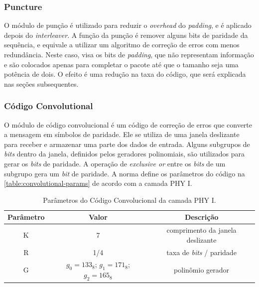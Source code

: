 	\subsubsection*{Puncture}

	O módulo de punção é utilizado para reduzir o \textit{overhead} do \textit{padding}, e é aplicado depois do \textit{interleaver}. A função da punção é remover alguns bits de paridade da sequência, e equivale a utilizar um algoritmo de correção de erros com menos redundância. Neste caso, visa os bits de \textit{padding}, que não representam informação e são colocados apenas para completar o pacote até que o tamanho seja uma potência de dois. O efeito é uma redução na taxa do código, que será explicada nas seções subsequentes.

	\subsubsection*{Código Convolutional}

	O módulo de código convolucional é um código de correção de erros que converte a mensagem em símbolos de paridade. Ele se utiliza de uma janela deslizante para receber e armazenar uma parte dos dados de entrada. Alguns subgrupos de \textit{bits} dentro da janela, definidos pelos geradores polinomiais, são utilizados para gerar os \textit{bits} de paridade. A operação de \textit{exclusive or} entre os \textit{bits} de um subgrupo gera um \textit{bit} de paridade. A norma define os parâmetros do código na \autoref{table:convolutional-params} de acordo com a camada PHY I.

	\begin{table}[ht]
		\caption{Parâmetros do Código Convolucional da camada PHY I.}
		\centering
		\begin{tabular}{c c c}
			\hline
			Parâmetro & Valor & Descrição \\ \hline
			K & 7 & comprimento da janela deslizante \\
			R & 1/4 & taxa de \textit{bits} / paridade \\
			G & $g_{0} = 133_{8}$; $g_{1} = 171_{8}$; $g_{2} = 165_{8}$ & polinômio gerador \\ \hline
		\end{tabular}
		\label{table:convolutional-params}
	\end{table}

